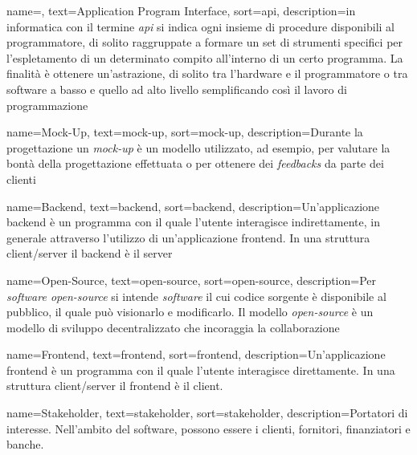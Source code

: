 {
    name=,
    text=Application Program Interface,
    sort=api,
    description={in informatica con il termine \emph{\acrfull{api}} si indica ogni insieme di procedure disponibili al programmatore, di solito raggruppate a formare un set di strumenti specifici per l'espletamento di un determinato compito all'interno di un certo programma. La finalità è ottenere un'astrazione, di solito tra l'hardware e il programmatore o tra software a basso e quello ad alto livello semplificando così il lavoro di programmazione}
}


{
    name=Mock-Up,
    text=mock-up,
    sort=mock-up,
    description={Durante la progettazione un \emph{mock-up} è un modello utilizzato, ad esempio, per valutare la bontà della progettazione effettuata o per ottenere dei \emph{feedbacks} da parte dei clienti}
}

{
    name=Backend,
    text=backend,
    sort=backend,
    description={Un'applicazione backend è un programma con il quale l'utente interagisce indirettamente, in generale attraverso l'utilizzo di un'applicazione \gls{frontend}. In una struttura client/server il backend è il server}
}

{
    name=Open-Source,
    text=open-source,
    sort=open-source,
    description={Per \emph{software open-source} si intende \emph{software} il cui codice sorgente è disponibile al pubblico, il quale può visionarlo e modificarlo. Il modello \emph{open-source} è un modello di sviluppo decentralizzato che incoraggia la collaborazione}
}

{
    name=Frontend,
    text=frontend,
    sort=frontend,
    description={Un'applicazione frontend è un programma con il quale l'utente interagisce direttamente. In una struttura client/server il frontend è il client.}
}

{
    name=Stakeholder,
    text=stakeholder,
    sort=stakeholder,
    description={Portatori di interesse. Nell’ambito del software, possono essere i clienti, fornitori, finanziatori e banche.}
}
